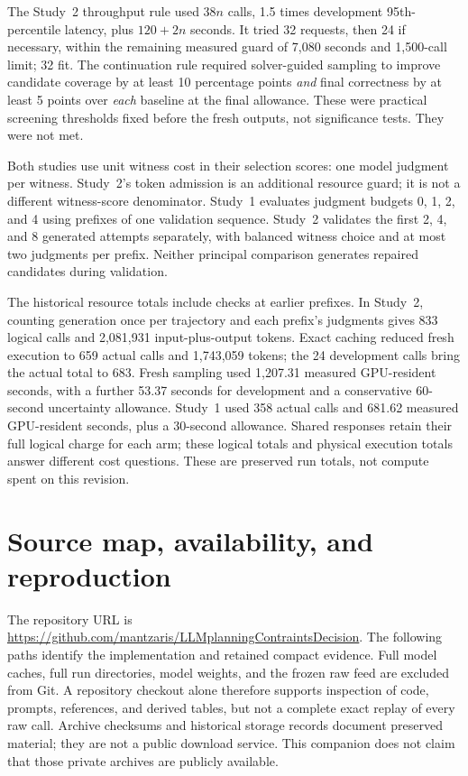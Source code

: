 \documentclass[11pt,a4paper]{scrartcl}
\begin{document}
The Study~2 throughput rule used $38n$ calls, 1.5 times development 95th-percentile latency, plus $120+2n$ seconds. It tried 32 requests, then 24 if necessary, within the remaining measured guard of 7,080 seconds and 1,500-call limit; 32 fit. The continuation rule required solver-guided sampling to improve candidate coverage by at least 10 percentage points \emph{and} final correctness by at least 5 points over \emph{each} baseline at the final allowance. These were practical screening thresholds fixed before the fresh outputs, not significance tests. They were not met.

Both studies use unit witness cost in their selection scores: one model judgment per witness. Study~2's token admission is an additional resource guard; it is not a different witness-score denominator. Study~1 evaluates judgment budgets 0, 1, 2, and 4 using prefixes of one validation sequence. Study~2 validates the first 2, 4, and 8 generated attempts separately, with balanced witness choice and at most two judgments per prefix. Neither principal comparison generates repaired candidates during validation.

The historical resource totals include checks at earlier prefixes. In Study~2, counting generation once per trajectory and each prefix's judgments gives 833 logical calls and 2,081,931 input-plus-output tokens. Exact caching reduced fresh execution to 659 actual calls and 1,743,059 tokens; the 24 development calls bring the actual total to 683. Fresh sampling used 1,207.31 measured GPU-resident seconds, with a further 53.37 seconds for development and a conservative 60-second uncertainty allowance. Study~1 used 358 actual calls and 681.62 measured GPU-resident seconds, plus a 30-second allowance. Shared responses retain their full logical charge for each arm; these logical totals and physical execution totals answer different cost questions. These are preserved run totals, not compute spent on this revision.

\section{Source map, availability, and reproduction}
The repository URL is \url{https://github.com/mantzaris/LLMplanningContraintsDecision}. The following paths identify the implementation and retained compact evidence. Full model caches, full run directories, model weights, and the frozen raw feed are excluded from Git. A repository checkout alone therefore supports inspection of code, prompts, references, and derived tables, but not a complete exact replay of every raw call. Archive checksums and historical storage records document preserved material; they are not a public download service. This companion does not claim that those private archives are publicly available.
\end{document}

